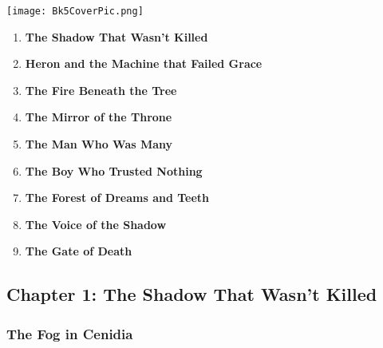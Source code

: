 \documentclass[12pt]{article}
\begin{document}
\vspace{.2in}

\begin{center}
    \texttt{[image: Bk5CoverPic.png]}
\end{center}

\vspace{.2in}

\begin{enumerate}
    \item \textbf{The Shadow That Wasn’t Killed} 

    \vspace{1em}
    \item \textbf{Heron and the Machine that Failed Grace} 

    \vspace{1em}
    \item \textbf{The Fire Beneath the Tree} 

    \vspace{1em}
    \item \textbf{The Mirror of the Throne} 

    \vspace{1em}
    \item \textbf{The Man Who Was Many} 

    \vspace{1em}
    \item \textbf{The Boy Who Trusted Nothing}

    \vspace{1em}
    \item \textbf{The Forest of Dreams and Teeth} 

    \vspace{1em}
    \item \textbf{The Voice of the Shadow}

    \vspace{1em}
    \item \textbf{The Gate of Death}

\end{enumerate}

\newpage

\subsection*{Chapter 1: The Shadow That Wasn’t Killed}

\vspace{.5in}

\subsubsection*{The Fog in Cenidia}
\end{document}
